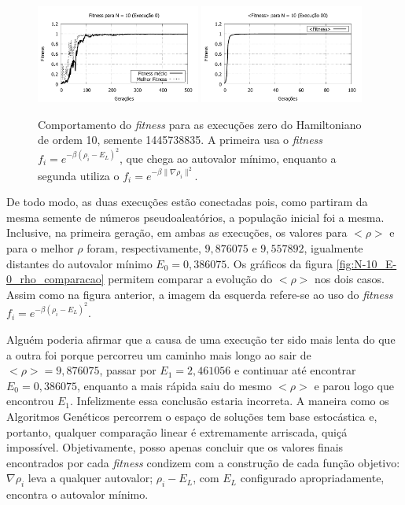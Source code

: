 	\begin{figure}[htbp]
		\centering
			\includegraphics[width=0.48\textwidth]{figs/resultados/fitnessEL/N-10_E-0_fitness.pdf}
			\includegraphics[width=0.48\textwidth]{figs/resultados/fitnessGrad/N10_00_fitness.pdf}
		\caption{Comportamento do \textit{fitness} para as execuções zero do Hamiltoniano de ordem 10, semente 1445738835. A primeira usa o \textit{fitness} $f_i = e^{-\beta(\rho_i - E_L)^2}$, que chega ao autovalor mínimo, enquanto a segunda utiliza o $f_i = e^{-\beta \| \nabla \rho_i \|^2}$.}
		\label{fig:N-10_E-0_fitness}
	\end{figure}
	
	De todo modo, as duas execuções estão conectadas pois, como partiram da mesma semente de números pseudoaleatórios, a população inicial foi a mesma. Inclusive, na primeira geração, em ambas as execuções, os valores para $<\rho>$ e para o melhor $\rho$ foram, respectivamente, $9,876075$ e $9,557892$, igualmente distantes do autovalor mínimo $E_0 = 0,386075$. Os gráficos da figura \ref{fig:N-10_E-0_rho_comparacao} permitem comparar a evolução do $<\rho>$ nos dois casos. Assim como na figura anterior, a imagem da esquerda refere-se ao uso do \textit{fitness} $f_i = e^{-\beta(\rho_i - E_L)^2}$.
	
	Alguém poderia afirmar que a causa de uma execução ter sido mais lenta do que a outra foi porque percorreu um caminho mais longo ao sair de $<\rho> = 9,876075$, passar por $E_1 = 2,461056$ e continuar até encontrar $E_0 = 0,386075$, enquanto a mais rápida saiu do mesmo $<\rho>$ e parou logo que encontrou $E_1$. Infelizmente essa conclusão estaria incorreta. A maneira como os Algoritmos Genéticos percorrem o espaço de soluções tem base estocástica e, portanto, qualquer comparação linear é extremamente arriscada, quiçá impossível. Objetivamente, posso apenas concluir que os valores finais encontrados por cada \textit{fitness} condizem com a construção de cada função objetivo: $\nabla \rho_i$ leva a qualquer autovalor; $\rho_i - E_L$, com $E_L$ configurado apropriadamente, encontra o autovalor mínimo.
	
